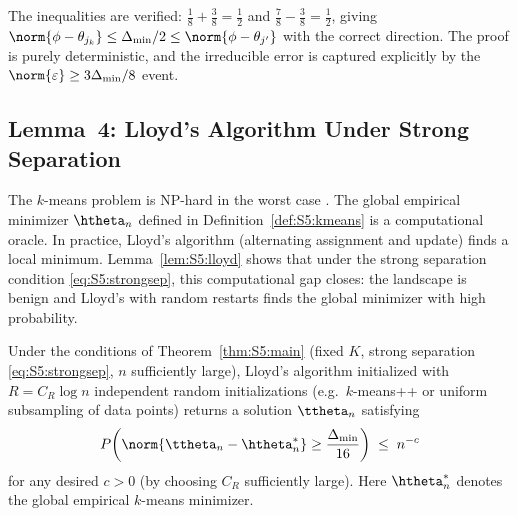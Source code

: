 \begin{remark}
The inequalities are verified:
$\frac18+\frac38=\frac12$ and $\frac78-\frac38=\frac12$, giving
$\norm{\phi-\theta_{j_k}}\le\Delta_{\min}/2\le\norm{\phi-\theta_{j'}}$
with the correct direction.  The proof is purely deterministic, and the
irreducible error is captured explicitly by the
$\norm{\varepsilon}\ge3\Delta_{\min}/8$ event.
\end{remark}

\subsection{Lemma~4: Lloyd's Algorithm Under Strong Separation}
\label{sec:S5:lem4}

The $k$-means problem is NP-hard in the worst case
\cite{aloise2009np,dasgupta2008hardness}.  The global empirical minimizer
$\htheta_n$ defined in Definition~\ref{def:S5:kmeans} is a computational
oracle.  In practice, Lloyd's algorithm (alternating assignment and update)
finds a local minimum.  Lemma~\ref{lem:S5:lloyd} shows that under the
strong separation condition \eqref{eq:S5:strongsep}, this computational gap
closes: the landscape is benign and Lloyd's with random restarts finds the
global minimizer with high probability.

\begin{lemma}
\label{lem:S5:lloyd}
Under the conditions of Theorem~\ref{thm:S5:main} (fixed $K$, strong
separation \eqref{eq:S5:strongsep}, $n$ sufficiently large), Lloyd's
algorithm initialized with $R=C_R\log n$ independent random initializations
(e.g.\ $k$-means++ or uniform subsampling of data points) returns a
solution $\ttheta_n$ satisfying
\[
P\!\left(\norm{\ttheta_n-\htheta_n^*}\ge\frac{\Delta_{\min}}{16}\right)
\;\le\; n^{-c}
\]
for any desired $c>0$ (by choosing $C_R$ sufficiently large).  Here
$\htheta_n^*$ denotes the global empirical $k$-means minimizer.
\end{lemma}

